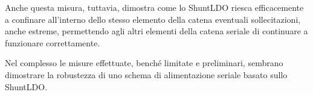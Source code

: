 Anche questa misura, tuttavia, dimostra come lo ShuntLDO riesca efficacemente a confinare all'interno dello stesso elemento della catena eventuali sollecitazioni, anche estreme, permettendo agli altri elementi della catena seriale di continuare a funzionare correttamente.

Nel complesso le misure effettuate, bench\'e limitate e preliminari, sembrano dimostrare la robustezza di uno schema di alimentazione seriale basato sullo ShuntLDO.
